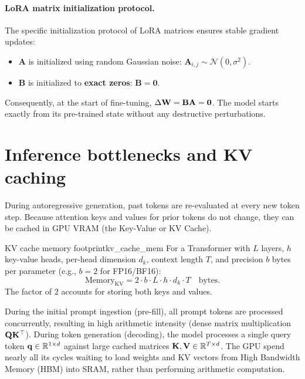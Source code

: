 \documentclass[../../main.tex]{subfiles}
\begin{document}
\paragraph{LoRA matrix initialization protocol.}
The specific initialization protocol of LoRA matrices ensures stable gradient updates:
\begin{itemize}
    \item $\mathbf{A}$ is initialized using random Gaussian noise: $\mathbf{A}_{i,j} \sim \mathcal{N}(0, \sigma^2)$.
    \item $\mathbf{B}$ is initialized to \textbf{exact zeros}: $\mathbf{B} = \mathbf{0}$.
\end{itemize}
Consequently, at the start of fine-tuning, $\Delta \mathbf{W} = \mathbf{B} \mathbf{A} = \mathbf{0}$. The model starts exactly from its pre-trained state without any destructive perturbations.


\section{Inference bottlenecks and KV caching}
During autoregressive generation, past tokens are re-evaluated at every new token step. Because attention keys and values for prior tokens do not change, they can be cached in GPU VRAM (the Key-Value or KV Cache).

\begin{theorem}{KV cache memory footprint}{kv_cache_mem}
For a Transformer with $L$ layers, $h$ key-value heads, per-head dimension $d_k$, context length $T$, and precision $b$ bytes per parameter (e.g., $b=2$ for FP16/BF16):
\begin{equation}
\text{Memory}_{\text{KV}} = 2 \cdot b \cdot L \cdot h \cdot d_k \cdot T \quad \text{bytes}.
\end{equation}
The factor of $2$ accounts for storing both keys and values.
\end{theorem}

\begin{intuition}
During the initial prompt ingestion (pre-fill), all prompt tokens are processed concurrently, resulting in high arithmetic intensity (dense matrix multiplication $\mathbf{Q} \mathbf{K}^\top$).
During token generation (decoding), the model processes a single query token $\mathbf{q} \in \mathbb{R}^{1 \times d}$ against large cached matrices $\mathbf{K}, \mathbf{V} \in \mathbb{R}^{T \times d}$. The GPU spend nearly all its cycles waiting to load weights and KV vectors from High Bandwidth Memory (HBM) into SRAM, rather than performing arithmetic computation.
\end{intuition}
\end{document}
